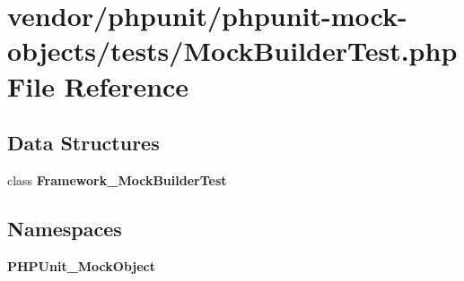 \section{vendor/phpunit/phpunit-\/mock-\/objects/tests/\+Mock\+Builder\+Test.php File Reference}
\label{_mock_builder_test_8php}
\subsection*{Data Structures}
\begin{DoxyCompactItemize}
\item 
class {\bf Framework\+\_\+\+Mock\+Builder\+Test}
\end{DoxyCompactItemize}
\subsection*{Namespaces}
\begin{DoxyCompactItemize}
\item 
 {\bf P\+H\+P\+Unit\+\_\+\+Mock\+Object}
\end{DoxyCompactItemize}
